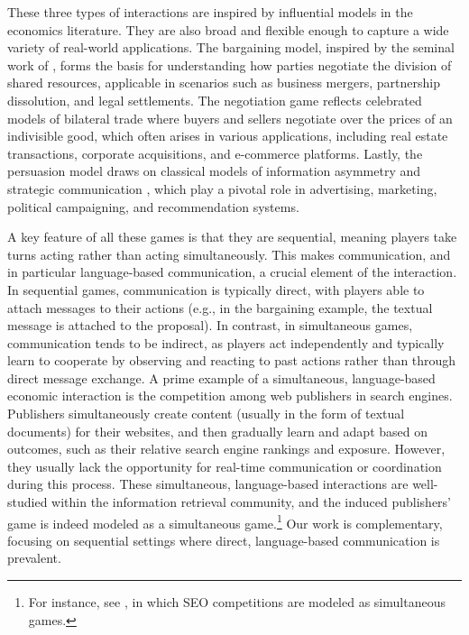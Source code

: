These three types of interactions are inspired by influential models in the economics literature. They are also broad and flexible enough to capture a wide variety of real-world applications. The bargaining model, inspired by the seminal work of \citet{rubinstein1982perfect}, forms the basis for understanding how parties negotiate the division of shared resources, applicable in scenarios such as business mergers, partnership dissolution, and legal settlements. 
The negotiation game reflects celebrated models of bilateral trade \cite{myerson1983efficient,McAfee1992} where buyers and sellers negotiate over the prices of an indivisible good, which often arises in various applications, including real estate transactions, corporate acquisitions, and e-commerce platforms. 
Lastly, the persuasion model draws on classical models of information asymmetry and strategic communication \cite{akerlof1978market,crawford1982strategic,cheaptalk}, which play a pivotal role in advertising, marketing, political campaigning, and recommendation systems.

A key feature of all these games is that they are sequential, meaning players take turns acting rather than acting simultaneously. This makes communication, and in particular language-based communication, a crucial element of the interaction. In sequential games, communication is typically direct, with players able to attach messages to their actions (e.g., in the bargaining example, the textual message is attached to the proposal). In contrast, in simultaneous games, communication tends to be indirect, as players act independently and typically learn to cooperate by observing and reacting to past actions rather than through direct message exchange. 
A prime example of a simultaneous, language-based economic interaction is the competition among web publishers in search engines. Publishers simultaneously create content (usually in the form of textual documents) for their websites, and then gradually learn and adapt based on outcomes, such as their relative search engine rankings and exposure. However, they usually lack the opportunity for real-time communication or coordination during this process. These simultaneous, language-based interactions are well-studied within the information retrieval community, and the induced publishers' game is indeed modeled as a simultaneous game.\footnote{For instance, see \citet{raifer2017information,ben2019convergence,10.1145/3477495.3532771,hron2022modeling,madmon2025search,madmon2025convergence,nachimovsky2024ranking}, in which SEO competitions are modeled as simultaneous games.}
Our work is complementary, focusing on sequential settings where direct, language-based communication is prevalent.

